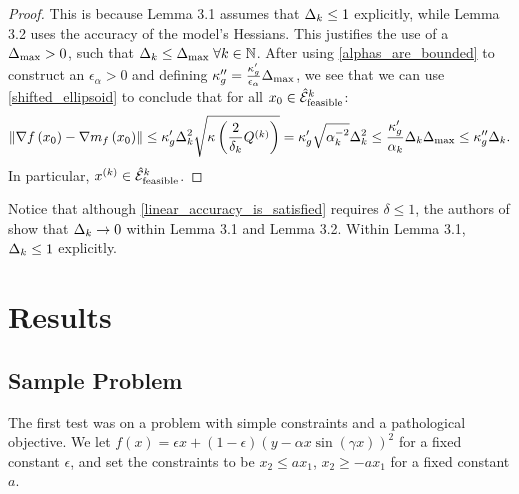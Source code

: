 \begin{proof}
This is because Lemma 3.1 assumes that $\Delta_k \le 1$ explicitly, while Lemma 3.2 uses the accuracy of the model's Hessians.
This justifies the use of a ${\Delta_{\textrm{max}}} > 0$, such that $\Delta_k \le {\Delta_{\textrm{max}}}\;\forall k \in \mathbb N$.
After using  \cref{alphas_are_bounded} to construct an $\epsilon_{\alpha} > 0$ and defining $\kappa''_{g} =  \frac{\kappa'_g}{\epsilon_{\alpha}}{\Delta_{\textrm{max}}}$, we see that
we can use  \cref{shifted_ellipsoid} to conclude that for all $x_0 \in {{\mathcal {\hat E}_{\text{feasible}}}^k}$:
\begin{align*}
\left\|\nabla f\left(x_0 \right) - \nabla m_f\left(x_0\right)\right\| \le 
\kappa'_g  \Delta_k^2 \sqrt{\kappa\left(\frac 2 {\delta_k} Q^{(k)}\right)}=  \kappa'_g \sqrt{\alpha_k^{-2}}\Delta_k^2 \le \frac{\kappa'_g}{\alpha_k} \Delta_k{\Delta_{\textrm{max}}}\le \kappa''_g\Delta_k.
\end{align*}
In particular, $x^{(k)} \in {{\mathcal {\hat E}_{\text{feasible}}}^k}$.
\end{proof}


Notice that although \cref{linear_accuracy_is_satisfied} requires $\delta \le 1$, the authors of  show that $\Delta_k \to 0$ within Lemma 3.1 and Lemma 3.2.
Within Lemma 3.1, $\Delta_k \le 1 $ explicitly. 

\newpage


\section{Results}


\subsection{Sample Problem}
The first test was on a problem with simple constraints and a pathological objective.
We let $f(x) = \epsilon x + (1-\epsilon)(y - \alpha x \sin(\gamma x))^2$ for a fixed constant $\epsilon$, and set the constraints to be
$x_2 \le ax_1$, $x_2 \ge -ax_1$ for a fixed constant $a$.

